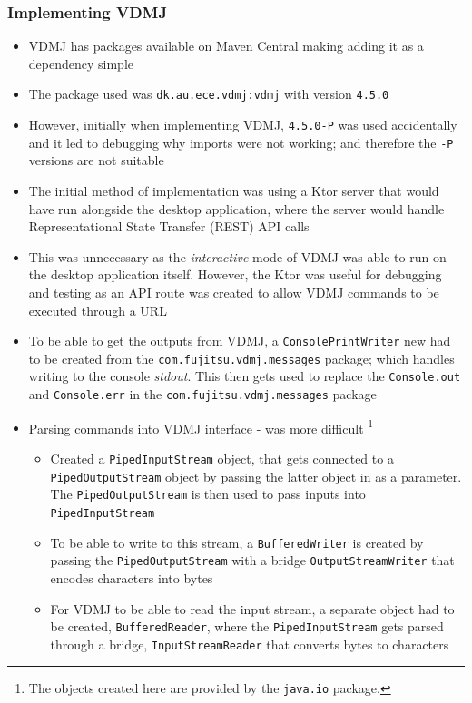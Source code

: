 \documentclass[../dissertation.tex]{subfiles}
\begin{document}
\subsubsection{Implementing VDMJ}
\begin{itemize}
  \item VDMJ has packages available on Maven Central making adding it as a dependency simple
  \item The package used was \lstinline|dk.au.ece.vdmj:vdmj| with version \lstinline|4.5.0|
  \item However, initially when implementing VDMJ, \lstinline|4.5.0-P| was used accidentally
    and it led to debugging why imports were not working; and therefore the \lstinline|-P|
    versions are not suitable
  \item The initial method of implementation was using a Ktor server that would have run
    alongside the desktop application, where the server would handle Representational State Transfer (REST)
    API calls
  \item This was unnecessary as the \textit{interactive} mode of VDMJ was able to run on
    the desktop application itself. However, the Ktor was useful for debugging and testing as
    an API route was created to allow VDMJ commands to be executed through a URL

  \item To be able to get the outputs from VDMJ, a \lstinline|ConsolePrintWriter| new had to be
    created from the \lstinline|com.fujitsu.vdmj.messages| package; which handles writing to
    the console \textit{stdout}. This then gets used to replace the \lstinline|Console.out| and
    \lstinline|Console.err| in the \lstinline|com.fujitsu.vdmj.messages| package

  \item Parsing commands into VDMJ interface - was more difficult
    \footnote{The objects created here are provided by the \lstinline|java.io| package.}
  \begin{itemize}
    \item Created a \lstinline|PipedInputStream| object, that gets connected to a \lstinline|PipedOutputStream|
      object by passing the latter object in as a parameter. The \lstinline|PipedOutputStream| is then used
      to pass inputs into \lstinline|PipedInputStream|
    \item To be able to write to this stream, a \lstinline|BufferedWriter| is created by passing the \lstinline|PipedOutputStream|
      with a bridge \lstinline|OutputStreamWriter| that encodes characters into bytes
    \item For VDMJ to be able to read the input stream, a separate object had to be created, \lstinline|BufferedReader|,
      where the \lstinline|PipedInputStream| gets parsed through a bridge, \lstinline|InputStreamReader| that converts
      bytes to characters
  \end{itemize}
\end{itemize}
\end{document}
